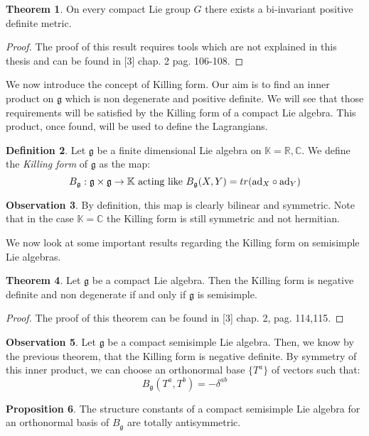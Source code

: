 \documentclass[12pt,a4paper]{report}
\theoremstyle{definition}
\newtheorem{Def}{Definition}[chapter]
\theoremstyle{Theorem}
\newtheorem{Theo}[Def]{Theorem}
\newtheorem{Prop}[Def]{Proposition}
\theoremstyle{definition}
\theoremstyle{definition}
\newtheorem{Obs}[Def]{Observation}
\begin{document}
	\begin{Theo} \label{Scal_prod_theo_1}
		On every compact Lie group $G$ there exists a bi-invariant positive definite metric.
	\end{Theo}
	\begin{proof}
		The proof of this result requires tools which are not explained in this thesis and can be found in [3] chap. 2 pag. 106-108.
	\end{proof}
	We now introduce the concept of Killing form. Our aim is to find an inner product on $\mathfrak{g}$ which is non degenerate and positive definite. We will see that those requirements will be satisfied by the Killing form of a compact Lie algebra. This product, once found, will be used to define the Lagrangians.
	\begin{Def}
		Let $\mathfrak{g}$ be a finite dimensional Lie algebra on $\mathbb{K}=\mathbb{R},\mathbb{C}$. We define the \textit{Killing form} of $\mathfrak{g}$ as the map:
		$$B_\mathfrak{g}:\mathfrak{g}\times \mathfrak{g}\rightarrow\mathbb{K}\hbox{ acting like } B_\mathfrak{g}(X,Y)=tr(\hbox{ad}_X\circ \hbox{ad}_Y)$$
	\end{Def}
	\begin{Obs}
		By definition, this map is clearly bilinear and symmetric. Note that in the case $\mathbb{K}=\mathbb{C}$ the Killing form is still symmetric and not hermitian.
	\end{Obs} 
	We now look at some important results regarding the Killing form on semisimple Lie algebras.
	\begin{Theo}
		Let $\mathfrak{g}$ be a compact Lie algebra. Then the Killing form is negative definite and non degenerate if and only if $\mathfrak{g}$ is semisimple.
	\end{Theo}
	\begin{proof}
		The proof of this theorem can be found in [3] chap. 2, pag. 114,115.
	\end{proof}
	\begin{Obs}
		Let $\mathfrak{g}$ be a compact semisimple Lie algebra. Then, we know by the previous theorem, that the Killing form is negative definite. By symmetry of this inner product, we can choose an orthonormal base $\{T^a\}$ of vectors such that:
		$$B_{\mathfrak{g}}(T^a,T^b)=-\delta^{ab}$$
	\end{Obs}
	\begin{Prop}
		The structure constants of a compact semisimple Lie algebra for an orthonormal basis of $B_\mathfrak{g}$ are totally antisymmetric.
	\end{Prop}
\end{document}
